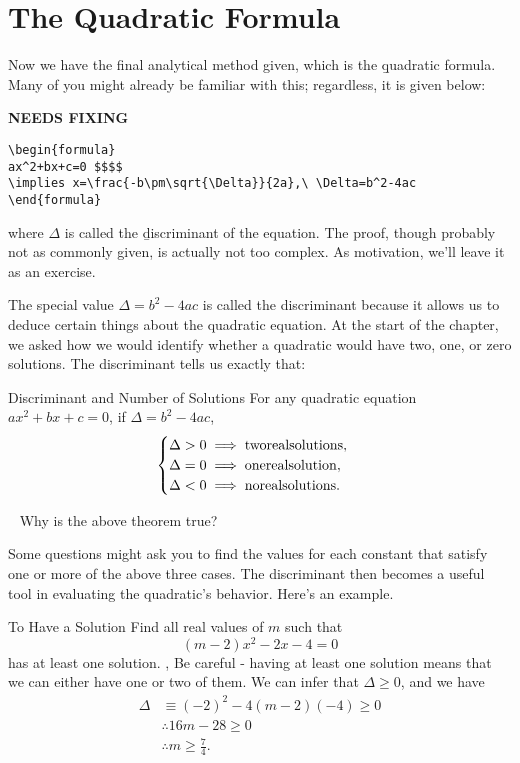 \section{The Quadratic Formula}
Now we have the final analytical method given, which is the \b{quadratic formula}. Many of you might already be familiar with this; regardless, it is given below:

{\hfill\Large\bfseries NEEDS FIXING\hfill}
\begin{lstlisting}
\begin{formula}
ax^2+bx+c=0 $$$$
\implies x=\frac{-b\pm\sqrt{\Delta}}{2a},\ \Delta=b^2-4ac
\end{formula}
 \end{lstlisting}
where $\Delta$ is called the \b{discriminant} of the equation. The proof, though probably not as commonly given, is actually not too complex. As motivation, we'll leave it as an exercise.

The special value $\Delta=b^2-4ac$ is called the discriminant because it allows us to deduce certain things about the quadratic equation. At the start of the chapter, we asked how we would identify whether a quadratic would have two, one, or zero solutions. The discriminant tells us exactly that:

\begin{theorem}{Discriminant and Number of Solutions}
For any quadratic equation $ax^2+bx+c=0$, if $\Delta=b^2-4ac$,
$$\begin{cases}
    \Delta>0\implies\rm{two real solutions,} \\
    \Delta=0\implies\rm{one real solution,} \\
    \Delta<0\implies\rm{no real solutions.}
\end{cases}$$
\end{theorem}
\begin{thinking}{~}
Why is the above theorem true?
\end{thinking}
Some questions might ask you to find the values for each constant that satisfy one or more of the above three cases. The discriminant then becomes a useful tool in evaluating the quadratic's behavior. Here's an example.
\begin{example}{To Have a Solution}
Find all real values of $m$ such that $$(m-2)x^2-2x-4=0$$ has at least one solution.
\sep
Be careful - having at least one solution means that we can either have one or two of them. We can infer that $\Delta\geq0$, and we have
\begin{align}
    \Delta&\equiv(-2)^2-4(m-2)(-4)\geq0 \\
    &\therefore16m-28\geq0 \\
    &\therefore m\geq\frac74.
\end{align}
\end{example}

